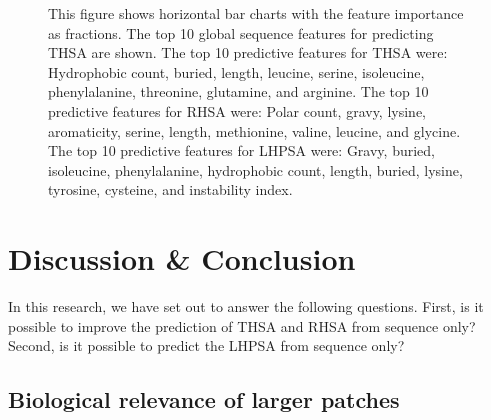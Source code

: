 \documentclass[11pt,a4paper]{article}
\begin{document}
\begin{figure}[!tbp]
  \centering
  \captionsetup{width=.9\linewidth}
  \caption{ This figure shows horizontal bar charts with the feature importance as fractions. The top 10 global sequence features for predicting THSA are shown. The top 10 predictive features for THSA were: Hydrophobic count, buried, length, leucine, serine, isoleucine, phenylalanine, threonine, glutamine, and arginine. The top 10 predictive features for RHSA were: Polar count, gravy, lysine, aromaticity, serine, length, methionine, valine, leucine, and glycine. The top 10 predictive features for LHPSA were: Gravy, buried, isoleucine, phenylalanine, hydrophobic count, length, buried, lysine, tyrosine, cysteine, and instability index.}
\end{figure}

\section{Discussion \& Conclusion}
In this research, we have set out to answer the following questions. First, is it possible to improve the prediction of THSA and RHSA from sequence only? Second, is it possible to predict the LHPSA from sequence only?

\subsection{Biological relevance of larger patches}
\end{document}
